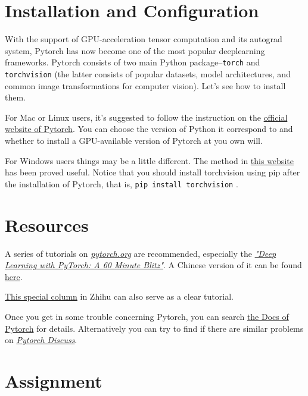 \documentclass[english]{../TeXTemplate/pkupaper}
\title{\titlemark}
\author{Jason Jia\and Narsil Zhang}
\date{Updated on \today}
\begin{document}
\maketitle
\section{Installation and Configuration}

With the support of GPU-acceleration tensor computation and its autograd system, Pytorch has now become one of the most popular deeplearning frameworks. Pytorch consists of two main Python package--\verb"torch" and \verb"torchvision" (the latter consists of popular datasets, model architectures, and common image transformations for computer vision). Let's see how to install them.

For Mac or Linux users, it's suggested to follow the instruction on the \href{http://pytorch.org}{official website of Pytorch}. You can choose the version of Python it correspond to and whether to install a GPU-available version of Pytorch at you own will.

For Windows users things may be a little different. The method in \href{https://zhuanlan.zhihu.com/p/26871672}{this website} has been proved useful. Notice that you should install torchvision using pip after the installation of Pytorch, that is, \verb"pip install torchvision" .

\section{Resources}

A series of tutorials on \href{http://pytorch.org}{\emph{pytorch.org}} are recommended, especially the \href{http://pytorch.org/tutorials/beginner/deep_learning_60min_blitz.html}{\emph{"Deep Learning with PyTorch: A 60 Minute Blitz"}}. A Chinese version of it can be found \href{https://zhuanlan.zhihu.com/p/25572330}{here}.

\href{https://zhuanlan.zhihu.com/c_94953554}{This special column} in Zhihu can also serve as a clear tutorial.

Once you get in some trouble concerning Pytorch, you can search \href{http://pytorch.org/docs/master/index.html}{the Docs of Pytorch} for details. Alternatively you can try to find if there are similar problems on \href{https://discuss.pytorch.org/}{\emph{Pytorch Discuss}}. 

\section{Assignment}
\end{document}
